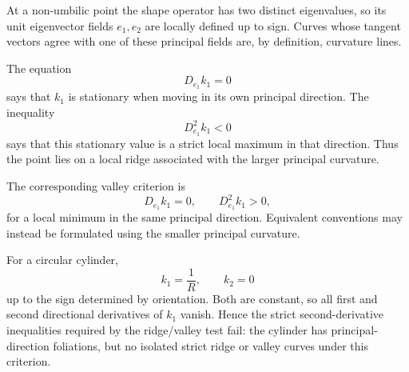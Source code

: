 \begin{solution}
At a non-umbilic point the shape operator has two distinct eigenvalues, so its
unit eigenvector fields \(e_1,e_2\) are locally defined up to sign.  Curves
whose tangent vectors agree with one of these principal fields are, by
definition, curvature lines.

The equation
\[
D_{e_1}k_1=0
\]
says that \(k_1\) is stationary when moving in its own principal direction.
The inequality
\[
D_{e_1}^2k_1<0
\]
says that this stationary value is a strict local maximum in that direction.
Thus the point lies on a local ridge associated with the larger principal
curvature.

The corresponding valley criterion is
\[
D_{e_1}k_1=0,
\qquad
D_{e_1}^2k_1>0,
\]
for a local minimum in the same principal direction.  Equivalent conventions
may instead be formulated using the smaller principal curvature.

For a circular cylinder,
\[
k_1=\frac1R,
\qquad
k_2=0
\]
up to the sign determined by orientation.  Both are constant, so all first
and second directional derivatives of \(k_1\) vanish.  Hence the strict
second-derivative inequalities required by the ridge/valley test fail:
the cylinder has principal-direction foliations, but no isolated strict
ridge or valley curves under this criterion.
\end{solution}
